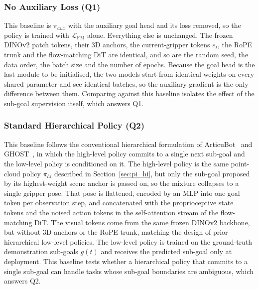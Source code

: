 \documentclass[letterpaper, 10 pt, conference]{ieeeconf}  %
\begin{document}
\subsubsection{No Auxiliary Loss (Q1)}
This baseline is $\pi_{aux}$ with the auxiliary goal head and its loss removed, so the policy is trained with $\mathcal{L}_{\text{FM}}$ alone. Everything else is unchanged. The frozen DINOv2 patch tokens, their 3D anchors, the current-gripper tokens $e_t$, the RoPE trunk and the flow-matching DiT are identical, and so are the random seed, the data order, the batch size and the number of epochs. Because the goal head is the last module to be initialised, the two models start from identical weights on every shared parameter and see identical batches, so the auxiliary gradient is the only difference between them. Comparing against this baseline isolates the effect of the sub-goal supervision itself, which answers Q1.

\subsubsection{Standard Hierarchical Policy (Q2)}
This baseline follows the conventional hierarchical formulation of ArticuBot~\cite{articubot} and GHOST~\cite{ghost}, in which the high-level policy commits to a single next sub-goal and the low-level policy is conditioned on it. The high-level policy is the same point-cloud policy $\pi_{hi}$ described in Section~\ref{sec:pi_hi}, but only the sub-goal proposed by its highest-weight scene anchor is passed on, so the mixture collapses to a single gripper pose. That pose is flattened, encoded by an MLP into one goal token per observation step, and concatenated with the proprioceptive state tokens and the noised action tokens in the self-attention stream of the flow-matching DiT. The visual tokens come from the same frozen DINOv2 backbone, but without 3D anchors or the RoPE trunk, matching the design of prior hierarchical low-level policies. The low-level policy is trained on the ground-truth demonstration sub-goals $g(t)$ and receives the predicted sub-goal only at deployment. This baseline tests whether a hierarchical policy that commits to a single sub-goal can handle tasks whose sub-goal boundaries are ambiguous, which answers Q2.
\end{document}

